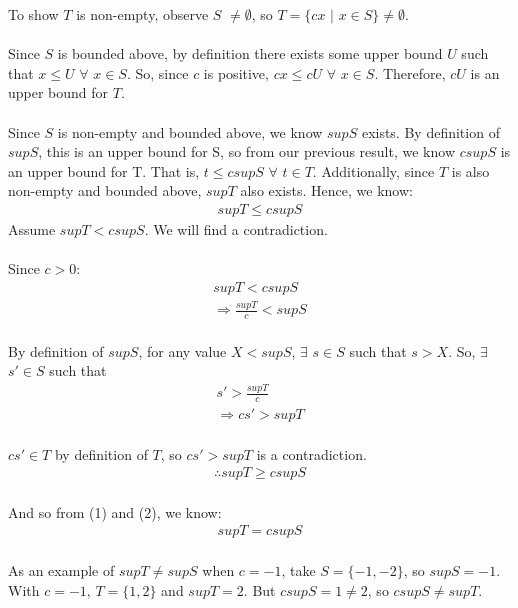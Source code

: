 \documentclass{article}
\begin{document}
\solution
To show \(T\) is non-empty, observe \(S\) \(\neq \emptyset\), so \(T = \{cx\) \(|\) \(x \in S\} \neq \emptyset\).
\\
\\
Since \(S\) is bounded above, by definition there exists some upper bound \(U\) such that \(x \leq U\) \(\forall\) \(x \in S\). So, since \(c\) is positive, \(cx \leq cU\) \(\forall\) \(x \in S\). Therefore, \(cU\) is an upper bound for \(T\).
\\
\\
Since \(S\) is non-empty and bounded above, we know \(supS\) exists. By definition of \(supS\), this is an upper bound for S, so from our previous result, we know \(csupS\) is an upper bound for T. That is, \(t \leq csupS\) \(\forall\) \(t \in T\). Additionally, since \(T\) is also non-empty and bounded above, \(supT\) also exists. Hence, we know:
\\
\begin{align}
  \label{}
  supT \leq csupS
\end{align}
Assume \(supT < csupS\). We will find a contradiction.
\\
\\
Since \(c > 0\):
\begin{align}
  \label{}
  supT < csupS \nonumber \\
  \Rightarrow \frac{supT}{c} < supS\nonumber
\end{align}
\\
By definition of \(supS\), for any value \(X < supS\), \(\exists\) \(s \in S\) such that \(s>X\). So, \(\exists\) \(s' \in S\) such that
\begin{align}
  \label{}
  s' > \frac{supT}{c} \nonumber \\
  \Rightarrow cs' > supT \nonumber
\end{align}
\\
\(cs' \in T\) by definition of \(T\), so \(cs' > supT\) is a contradiction.
\\
\begin{align}
  \label{}
  \therefore supT \geq csupS
\end{align}
\\
And so from (1) and (2), we know:
\begin{align}
  \label{}
  supT = csupS \nonumber
\end{align}
\\
As an example of \(supT \neq supS\) when \(c=-1\), take \(S = \{-1,-2\}\), so \(supS = -1\). With \(c=-1\), \(T = \{1,2\}\) and \(supT = 2\). But \(csupS = 1 \neq 2\), so \(csupS \neq supT\).
\\\\\\
\end{document}
